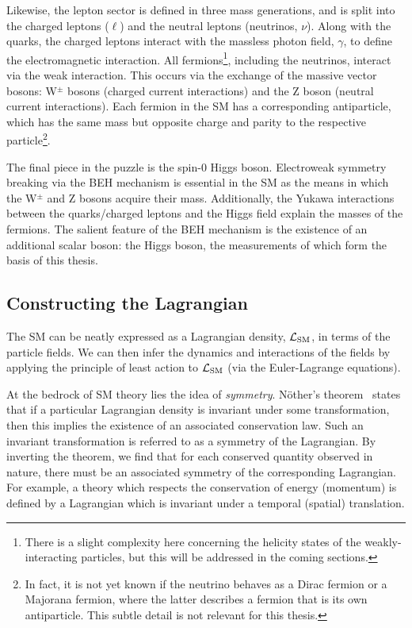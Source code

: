 Likewise, the lepton sector is defined in three mass generations, and is split into the charged leptons ($\ell$) and the neutral leptons (neutrinos, $\nu$). Along with the quarks, the charged leptons interact with the massless photon field, $\gamma$, to define the electromagnetic interaction. All fermions\footnote{There is a slight complexity here concerning the helicity states of the weakly-interacting particles, but this will be addressed in the coming sections.}, including the neutrinos, interact via the weak interaction. This occurs via the exchange of the massive vector bosons: W$^{\pm}$ bosons (charged current interactions) and the Z boson (neutral current interactions). Each fermion in the SM has a corresponding antiparticle, which has the same mass but opposite charge and parity to the respective particle\footnote{In fact, it is not yet known if the neutrino behaves as a Dirac fermion or a Majorana fermion, where the latter describes a fermion that is its own antiparticle. This subtle detail is not relevant for this thesis.}.

The final piece in the puzzle is the spin-0 Higgs boson. Electroweak symmetry breaking via the BEH mechanism is essential in the SM as the means in which the W$^{\pm}$ and Z bosons acquire their mass. Additionally, the Yukawa interactions between the quarks/charged leptons and the Higgs field explain the masses of the fermions. The salient feature of the BEH mechanism is the existence of an additional scalar boson: the Higgs boson, the measurements of which form the basis of this thesis.

\subsection{Constructing the Lagrangian}\label{sec:theory_sm}
The SM can be neatly expressed as a Lagrangian density, $\mathcal{L}_{\rm{SM}}$, in terms of the particle fields. We can then infer the dynamics and interactions of the fields by applying the principle of least action to $\mathcal{L}_{\rm{SM}}$ (via the Euler-Lagrange equations). 

At the bedrock of SM theory lies the idea of \textit{symmetry}. N\"{o}ther's theorem~\cite{doi:10.1080_00411457108231446} states that if a particular Lagrangian density is invariant under some transformation, then this implies the existence of an associated conservation law. Such an invariant transformation is referred to as a symmetry of the Lagrangian. By inverting the theorem, we find that for each conserved quantity observed in nature, there must be an associated symmetry of the corresponding Lagrangian. For example, a theory which respects the conservation of energy (momentum) is defined by a Lagrangian which is invariant under a temporal (spatial) translation.


